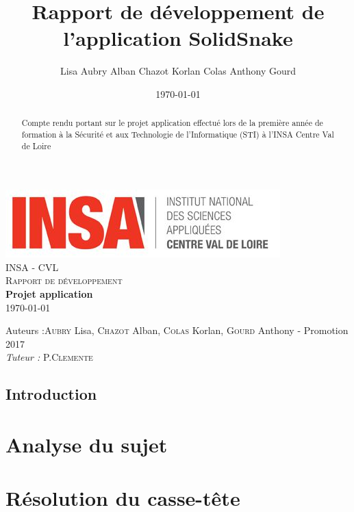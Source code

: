 \documentclass[a4paper,10pt]{report}
\title{Rapport de développement de l'application SolidSnake}
\author{Lisa Aubry Alban Chazot Korlan Colas Anthony Gourd}
\date{\today}
\begin{document}
\begin{titlepage}
  \begin{center}

    \includegraphics[scale=1]{img/insacvl.jpg}~\\[1.5cm]

    \textsc{\LARGE INSA - CVL}\\[2cm]

    \textsc{\Large Rapport de développement}\\[1.5cm]

    { \huge \bfseries Projet application\\[0.4cm] }
    \today
    
    \vfill

    Auteurs :\textsc{Aubry} Lisa, \textsc{Chazot} Alban, \textsc{Colas} Korlan, \textsc{Gourd} Anthony - Promotion 2017\\
    \emph{Tuteur :} P.\textsc{Clemente}\\
  \end{center}
\end{titlepage}

\begin{abstract}
Compte rendu portant sur le projet application effectué lors de la première année de formation à la Sécurité et aux Technologie de l'Informatique (STI) à l'INSA Centre Val de Loire
\end{abstract}

\tableofcontents

\chapter*{Introduction}


\part{Analyse du sujet}



\part{Résolution du casse-tête}
\end{document}
